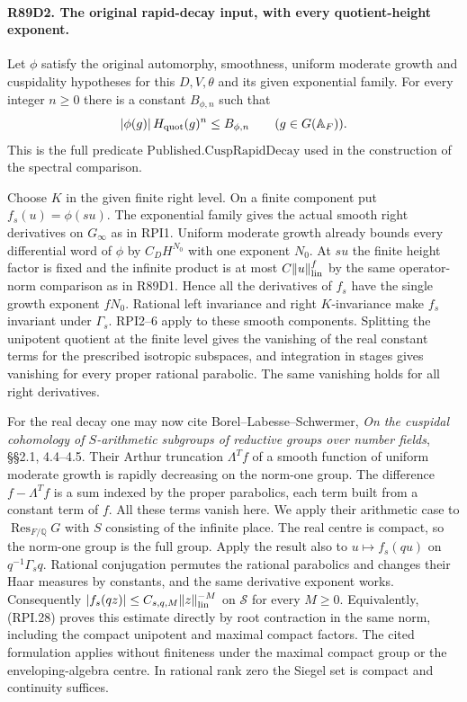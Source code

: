 \paragraph{R89D2. The original rapid-decay input, with every quotient-height exponent.}
Let $\phi$ satisfy the original automorphy, smoothness, uniform
moderate growth and cuspidality hypotheses for this $D,V,\theta$ and
its given exponential family. For every integer $n\ge0$ there is a
constant $B_{\phi,n}$ such that
\[
        |\phi(g)|\, H_{\rm quot}(g)^n\le B_{\phi,n}
                        \qquad(g\in G(\mathbb A_F)).
\]
This is the full predicate $\mathrm{Published.CuspRapidDecay}$ used in
the construction of the spectral comparison.

Choose $K$ in the given finite right level. On a finite component put
$f_s(u)=\phi(su)$. The exponential family gives the actual smooth
right derivatives on $G_\infty$ as in RPI1. Uniform moderate growth
already bounds every differential word of $\phi$ by $C_D H^{N_0}$
with one exponent $N_0$. At $su$ the finite height factor is fixed
and the infinite product is at most $C\|u\|_{\rm lin}^{f}$ by the
same operator-norm comparison as in R89D1. Hence all the derivatives
of $f_s$ have the single growth exponent $fN_0$. Rational left
invariance and right $K$-invariance make $f_s$ invariant under
$\Gamma_s$. RPI2--6 apply to these smooth components. Splitting the
unipotent quotient at the finite level gives the vanishing of the
real constant terms for the prescribed isotropic subspaces, and
integration in stages gives vanishing for every proper rational
parabolic. The same vanishing holds for all right derivatives.

For the real decay one may now cite Borel--Labesse--Schwermer,
\emph{On the cuspidal cohomology of $S$-arithmetic subgroups of
reductive groups over number fields}, \S\S2.1, 4.4--4.5.
Their Arthur truncation $\Lambda^T f$ of a smooth function of uniform
moderate growth is rapidly decreasing on the norm-one group. The
difference $f-\Lambda^T f$ is a sum indexed by the proper parabolics,
each term built from a constant term of $f$. All these terms vanish
here. We apply their arithmetic case to $\operatorname{Res}_{F/\mathbb Q}G$
with $S$ consisting of the infinite place. The real centre is
compact, so the norm-one group is the full group. Apply the result
also to $u\mapsto f_s(qu)$ on $q^{-1}\Gamma_s q$. Rational conjugation
permutes the rational parabolics and changes their Haar measures by
constants, and the same derivative exponent works. Consequently
$|f_s(qz)|\le C_{s,q,M}\|z\|_{\rm lin}^{-M}$ on $\mathcal S$
for every $M\ge0$. Equivalently, (RPI.28) proves this estimate
directly by root contraction in the same norm, including the compact
unipotent and maximal compact factors. The cited formulation applies
without finiteness under the maximal compact group or the
enveloping-algebra centre. In rational rank zero the Siegel set is
compact and continuity suffices.

